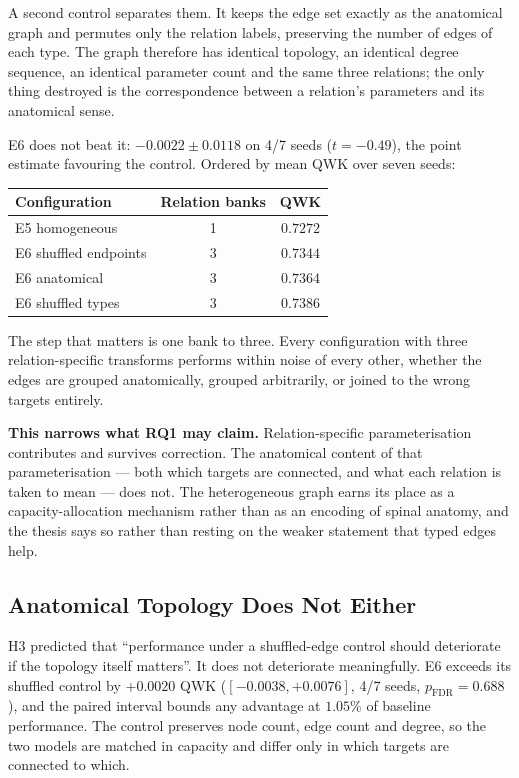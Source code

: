 \documentclass[12pt,a4paper]{report}
\begin{document}
A second control separates them. It keeps the edge set exactly as the anatomical
graph and permutes only the relation labels, preserving the number of edges of
each type. The graph therefore has identical topology, an identical degree
sequence, an identical parameter count and the same three relations; the only
thing destroyed is the correspondence between a relation's parameters and its
anatomical sense.

E6 does not beat it: $-0.0022 \pm 0.0118$ on 4/7 seeds ($t = -0.49$), the point
estimate favouring the control. Ordered by mean QWK over seven seeds:

\begin{center}
\begin{tabular}{lcc}
\toprule
Configuration & Relation banks & QWK \\
\midrule
E5 homogeneous & 1 & $0.7272$ \\
E6 shuffled endpoints & 3 & $0.7344$ \\
E6 anatomical & 3 & $0.7364$ \\
E6 shuffled types & 3 & $0.7386$ \\
\bottomrule
\end{tabular}
\end{center}

The step that matters is one bank to three. Every configuration with three
relation-specific transforms performs within noise of every other, whether the
edges are grouped anatomically, grouped arbitrarily, or joined to the wrong
targets entirely.

\textbf{This narrows what RQ1 may claim.} Relation-specific parameterisation
contributes and survives correction. The anatomical content of that
parameterisation --- both which targets are connected, and what each relation is
taken to mean --- does not. The heterogeneous graph earns its place as a
capacity-allocation mechanism rather than as an encoding of spinal anatomy, and
the thesis says so rather than resting on the weaker statement that typed edges
help.

\subsection{Anatomical Topology Does Not Either}

H3 predicted that \enquote{performance under a shuffled-edge control should
deteriorate if the topology itself matters}. It does not deteriorate
meaningfully. E6 exceeds its shuffled control by $+0.0020$ QWK
($[-0.0038, +0.0076]$, 4/7 seeds, $p_{\mathrm{FDR}} = 0.688$), and the paired
interval bounds any advantage at $1.05\%$ of baseline performance. The control
preserves node count, edge count and degree, so the two models are matched in
capacity and differ only in which targets are connected to which.
\end{document}
